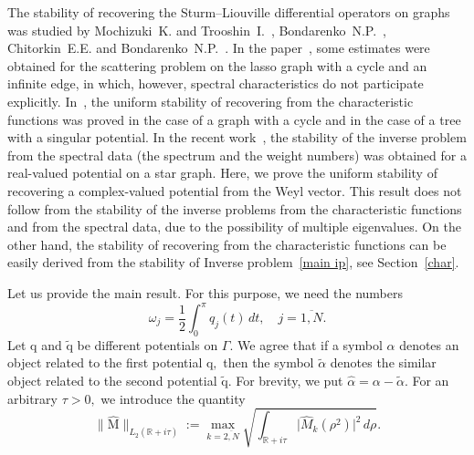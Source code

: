 \documentclass[a4paper, 12pt] {article}
\theoremstyle{plain}
\theoremstyle{remark}
\theoremstyle{plain}
\theoremstyle{definition}
\numberwithin{equation}{section}
\begin{document}
The stability of recovering the Sturm--Liouville differential operators on graphs was studied by Mochizuki~K. and Trooshin~I.~\cite{moch}, Bondarenko~N.P.~\cite{cycle,tree}, Chitorkin~E.E. and Bondaren\-ko~N.P.~\cite{arxiv}. In the paper~\cite{moch}, some estimates were obtained for the scattering problem on the lasso graph with a cycle and an infinite edge, in which, however, spectral characteristics do not participate explicitly. In~\cite{cycle,tree}, the uniform stability of recovering from the characteristic functions was proved  in the case of a graph with a cycle and in the case of a tree with a singular potential.
In the recent work~\cite{arxiv}, the stability of the inverse problem from the spectral data (the spectrum and the weight numbers) was obtained for a real-valued potential on a star graph. Here, we prove the uniform stability of recovering a complex-valued potential from the Weyl vector. This result does not follow from the stability of the inverse problems from the characteristic functions and from the spectral data, due to the possibility of multiple eigenvalues.
On the other hand, the stability of recovering from the characteristic functions can be easily derived from the stability of Inverse problem~\ref{main ip}, see Section~\ref{char}.

Let us provide the main result.
For this purpose, we need the numbers $$\omega_j = \frac12 \int_0^\pi q_j(t)\, dt, \quad j=\overline{1, N}.$$
Let $\mathrm{q}$ and $\mathrm{\tilde q}$ be different potentials on $\Gamma.$ We agree that if a symbol $\alpha$ denotes an object related to the first potential $\mathrm{q},$ then the symbol $\tilde \alpha$ denotes the similar object related to the second potential $\mathrm{\tilde q}.$ For brevity, we put $\hat \alpha = \alpha - \tilde \alpha.$
For an arbitrary $\tau >0,$ we introduce the quantity
\begin{equation*}\label{tau-norm}
\|\mathrm{\hat M}\|_{L_2({\mathbb R}+i \tau)} := \max_{k=\overline{2, N}} \sqrt{\mathop{\int}_{{\mathbb R}+i \tau}\big|\hat M_k(\rho^2)\big|^2 \,d\rho}.
\end{equation*}
\end{document}
